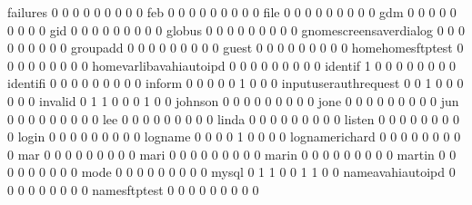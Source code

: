 \documentclass[compress,8pt]{beamer}
\begin{document}
\begin{frame}
\begin{Schunk}
  failures                                   0   0   0   0   0   0   0   0   0
  feb                                        0   0   0   0   0   0   0   0   0
  file                                       0   0   0   0   0   0   0   0   0
  gdm                                        0   0   0   0   0   0   0   0   0
  gid                                        0   0   0   0   0   0   0   0   0
  globus                                     0   0   0   0   0   0   0   0   0
  gnomescreensaverdialog                     0   0   0   0   0   0   0   0   0
  groupadd                                   0   0   0   0   0   0   0   0   0
  guest                                      0   0   0   0   0   0   0   0   0
  homehomesftptest                           0   0   0   0   0   0   0   0   0
  homevarlibavahiautoipd                     0   0   0   0   0   0   0   0   0
  identif                                    1   0   0   0   0   0   0   0   0
  identifi                                   0   0   0   0   0   0   0   0   0
  inform                                     0   0   0   0   0   1   0   0   0
  inputuserauthrequest                       0   0   1   0   0   0   0   0   0
  invalid                                    0   1   1   0   0   0   1   0   0
  johnson                                    0   0   0   0   0   0   0   0   0
  jone                                       0   0   0   0   0   0   0   0   0
  jun                                        0   0   0   0   0   0   0   0   0
  lee                                        0   0   0   0   0   0   0   0   0
  linda                                      0   0   0   0   0   0   0   0   0
  listen                                     0   0   0   0   0   0   0   0   0
  login                                      0   0   0   0   0   0   0   0   0
  logname                                    0   0   0   0   1   0   0   0   0
  lognamerichard                             0   0   0   0   0   0   0   0   0
  mar                                        0   0   0   0   0   0   0   0   0
  mari                                       0   0   0   0   0   0   0   0   0
  marin                                      0   0   0   0   0   0   0   0   0
  martin                                     0   0   0   0   0   0   0   0   0
  mode                                       0   0   0   0   0   0   0   0   0
  mysql                                      0   1   1   0   0   1   1   0   0
  nameavahiautoipd                           0   0   0   0   0   0   0   0   0
  namesftptest                               0   0   0   0   0   0   0   0   0

\end{Schunk}
\end{frame}
\end{document}
